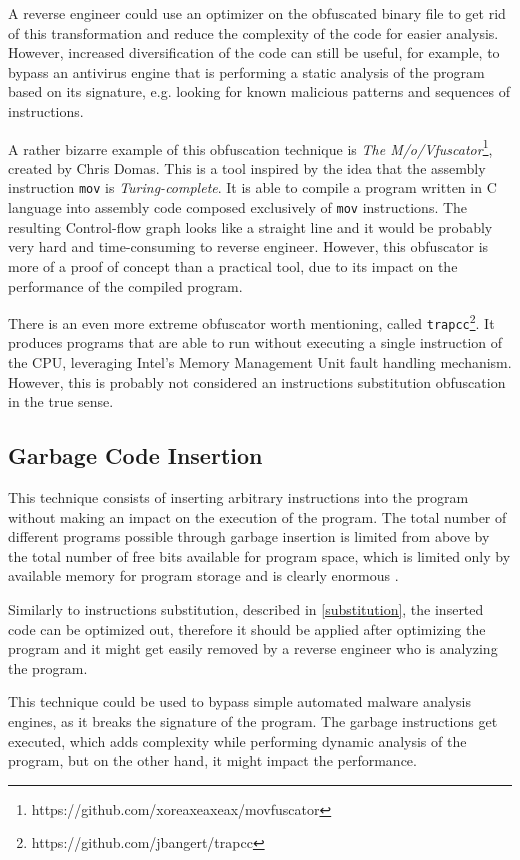 \documentclass[
  digital, %
  table,   %
  twoside, %
  nolof,     %
  nolot,     %
]{fithesis3}
\theoremstyle{definition}
\begin{document}
A reverse engineer could use an optimizer on the obfuscated binary file to get rid of this transformation and reduce the complexity of the code for easier analysis. However, increased diversification of the code can still be useful, for example, to bypass an antivirus engine that is performing a static analysis of the program based on its signature, e.g. looking for known malicious patterns and sequences of instructions.

A rather bizarre example of this obfuscation technique is \textit{The M/o/Vfuscator}\footnote{https://github.com/xoreaxeaxeax/movfuscator}, created by Chris Domas. This is a tool inspired by the idea that the assembly instruction \texttt{mov} is \textit{Turing-complete}. It is able to compile a program written in C language into assembly code composed exclusively of \texttt{mov} instructions. The resulting Control-flow graph looks like a straight line and it would be probably very hard and time-consuming to reverse engineer. However, this obfuscator is more of a proof of concept than a practical tool, due to its impact on the performance of the compiled program. 

There is an even more extreme obfuscator worth mentioning, called \texttt{trapcc}\footnote{https://github.com/jbangert/trapcc}. It produces programs that are able to run without executing a single instruction of the CPU, leveraging Intel's Memory Management Unit fault handling mechanism. However, this is probably not considered an instructions substitution obfuscation in the true sense. 

\subsection{Garbage Code Insertion} \label{garbage}
This technique consists of inserting arbitrary instructions into the program without making an impact on the execution of the program. The total number of different programs possible
through garbage insertion is limited from above by the total number of free bits available for program space, which is limited only by available memory for program storage and is clearly enormous \cite{os_protection}. 

Similarly to instructions substitution, described in \ref{substitution}, the inserted code can be optimized out, therefore it should be applied after optimizing the program and it might get easily removed by a reverse engineer who is analyzing the program. 

This technique could be used to bypass simple automated malware analysis engines, as it breaks the signature of the program. The garbage instructions get executed, which adds complexity while performing dynamic analysis of the program, but on the other hand, it might impact the performance. 
\end{document}
